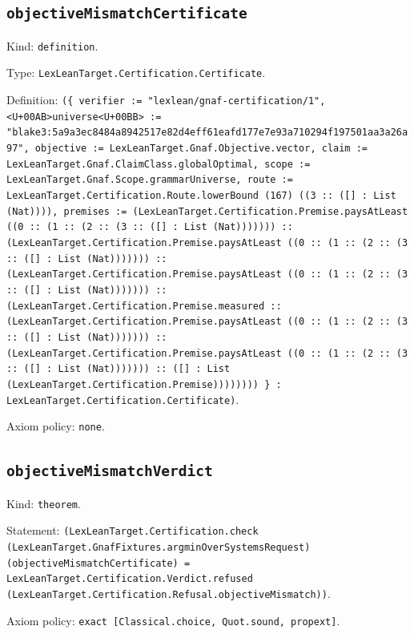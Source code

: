 \documentclass[11pt]{article}
\begin{document}
\subsection*{\texttt{objectiveMismatchCertificate}}
\noindent Kind: \texttt{definition}.\par
\noindent Type: \texttt{LexLeanTarget.Certification.Certificate}.\par
\noindent Definition: \texttt{(\{ verifier := "lexlean/gnaf-certification/1", <U+00AB>universe<U+00BB> := "blake3:5a9a3ec8484a8942517e82d4eff61eafd177e7e93a710294f197501aa3a26a97", objective := LexLeanTarget.Gnaf.Objective.vector, claim := LexLeanTarget.Gnaf.ClaimClass.globalOptimal, scope := LexLeanTarget.Gnaf.Scope.grammarUniverse, route := LexLeanTarget.Certification.Route.lowerBound (167) ((3 :: ([] : List (Nat)))), premises := (LexLeanTarget.Certification.Premise.paysAtLeast ((0 :: (1 :: (2 :: (3 :: ([] : List (Nat))))))) :: (LexLeanTarget.Certification.Premise.paysAtLeast ((0 :: (1 :: (2 :: (3 :: ([] : List (Nat))))))) :: (LexLeanTarget.Certification.Premise.paysAtLeast ((0 :: (1 :: (2 :: (3 :: ([] : List (Nat))))))) :: (LexLeanTarget.Certification.Premise.measured :: (LexLeanTarget.Certification.Premise.paysAtLeast ((0 :: (1 :: (2 :: (3 :: ([] : List (Nat))))))) :: (LexLeanTarget.Certification.Premise.paysAtLeast ((0 :: (1 :: (2 :: (3 :: ([] : List (Nat))))))) :: ([] : List (LexLeanTarget.Certification.Premise)))))))) \} : LexLeanTarget.Certification.Certificate)}.\par
\noindent Axiom policy: \texttt{none}.\par
\subsection*{\texttt{objectiveMismatchVerdict}}
\noindent Kind: \texttt{theorem}.\par
\noindent Statement: \texttt{(LexLeanTarget.Certification.check (LexLeanTarget.GnafFixtures.argminOverSystemsRequest) (objectiveMismatchCertificate) = LexLeanTarget.Certification.Verdict.refused (LexLeanTarget.Certification.Refusal.objectiveMismatch))}.\par
\noindent Axiom policy: \texttt{exact [Classical.choice, Quot.sound, propext]}.\par
\end{document}
